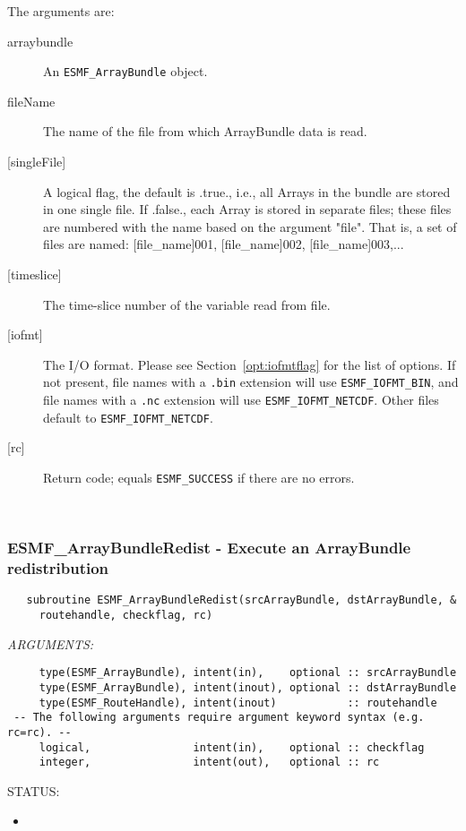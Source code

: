      The arguments are:
     \begin{description}
     \item[arraybundle] 
       An {\tt ESMF\_ArrayBundle} object.
     \item[fileName]
       The name of the file from which ArrayBundle data is read.
     \item[{[singleFile]}]
       A logical flag, the default is .true., i.e., all Arrays in the bundle 
       are stored in one single file. If .false., each Array is stored 
       in separate files; these files are numbered with the name based on the
       argument "file". That is, a set of files are named: [file\_name]001,
       [file\_name]002, [file\_name]003,...
     \item[{[timeslice]}]
      The time-slice number of the variable read from file.
     \item[{[iofmt]}]
       \begin{sloppypar}
      The I/O format.  Please see Section~\ref{opt:iofmtflag} for the list
      of options. If not present, file names with a {\tt .bin} extension will
      use {\tt ESMF\_IOFMT\_BIN}, and file names with a {\tt .nc} extension
      will use {\tt ESMF\_IOFMT\_NETCDF}.  Other files default to
      {\tt ESMF\_IOFMT\_NETCDF}.
       \end{sloppypar}
     \item[{[rc]}] 
       Return code; equals {\tt ESMF\_SUCCESS} if there are no errors.
     \end{description}
   
 
\mbox{}\hrulefill\ 
 
\subsubsection [ESMF\_ArrayBundleRedist] {ESMF\_ArrayBundleRedist - Execute an ArrayBundle redistribution}


\begin{verbatim}   subroutine ESMF_ArrayBundleRedist(srcArrayBundle, dstArrayBundle, &
     routehandle, checkflag, rc)\end{verbatim}{\em ARGUMENTS:}
\begin{verbatim}     type(ESMF_ArrayBundle), intent(in),    optional :: srcArrayBundle
     type(ESMF_ArrayBundle), intent(inout), optional :: dstArrayBundle
     type(ESMF_RouteHandle), intent(inout)           :: routehandle
 -- The following arguments require argument keyword syntax (e.g. rc=rc). --
     logical,                intent(in),    optional :: checkflag
     integer,                intent(out),   optional :: rc\end{verbatim}
{\sf STATUS:}
   \begin{itemize}
   \item{}
   \end{itemize}
  
